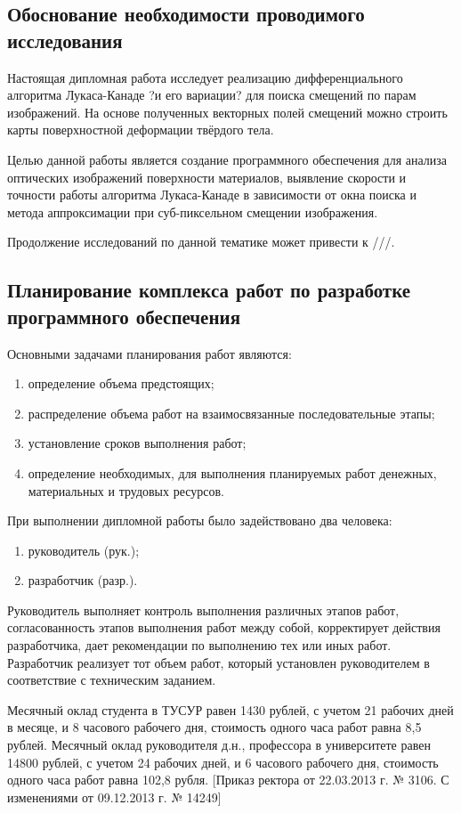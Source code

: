 \subsection{Обоснование необходимости проводимого исследования}

Настоящая дипломная работа исследует реализацию дифференциального алгоритма Лукаса-Канаде ?и его вариации? для поиска смещений по парам изображений. На основе полученных векторных полей смещений можно строить карты поверхностной деформации твёрдого тела. 

Целью данной работы является создание программного обеспечения для анализа оптических изображений поверхности материалов, выявление скорости и точности работы алгоритма Лукаса-Канаде в зависимости от окна поиска и метода аппроксимации при суб-пиксельном смещении изображения.

Продолжение исследований по данной тематике может привести к ///.
\subsection{Планирование комплекса работ по разработке программного обеспечения}
Основными задачами планирования работ являются:
\begin{enumerate}
\item определение объема предстоящих;
\item распределение объема работ на взаимосвязанные последовательные этапы;
\item установление сроков выполнения работ;
\item определение необходимых, для выполнения планируемых работ денежных, материальных и трудовых ресурсов.
\end{enumerate}
При выполнении дипломной работы было задействовано два человека:
\begin{enumerate}
\item руководитель (рук.);
\item разработчик (разр.).
\end{enumerate}
Руководитель выполняет контроль выполнения различных этапов работ, согласованность этапов выполнения работ между собой, корректирует действия разработчика, дает рекомендации по выполнению тех или иных работ. Разработчик реализует тот объем работ, который установлен руководителем в соответствие с техническим заданием.

Месячный оклад студента в ТУСУР равен 1430 рублей, с учетом 21 рабочих дней в месяце, и 8 часового рабочего дня, стоимость одного часа работ равна 8,5 рублей. Месячный оклад руководителя д.н., профессора в университете равен 14800 рублей, с учетом 24 рабочих дней, и 6 часового рабочего дня, стоимость одного часа работ равна 102,8 рубля. [Приказ ректора от 22.03.2013 г. № 3106. С изменениями от 09.12.2013 г. № 14249]

